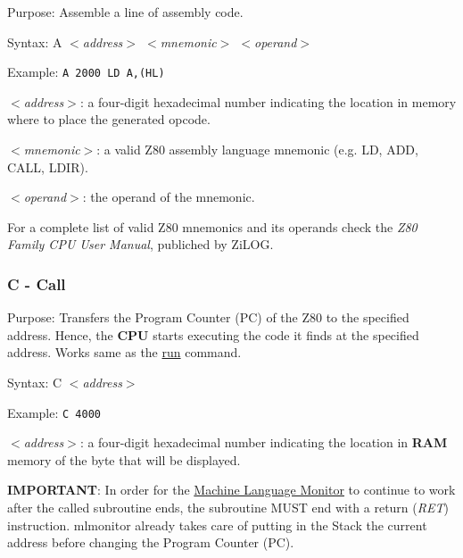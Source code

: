        Purpose: Assemble a line of assembly code.

        Syntax: A \textit{$<$address$>$ $<$mnemonic$>$ $<$operand$>$}

        Example: \texttt{A 2000 LD A,(HL)}

        \hspace{1cm}\textit{$<$address$>$}: a four-digit hexadecimal number indicating
        the location in memory where to place the generated opcode.

        \hspace{1cm}\textit{$<$mnemonic$>$}: a valid Z80 assembly language
        mnemonic (e.g. LD, ADD, CALL, LDIR).

        \hspace{1cm}\textit{$<$operand$>$}: the operand of the mnemonic.

        For a complete list of valid Z80 mnemonics and its operands check the
        \textit{Z80 Family CPU User Manual}\cite{z80manual}, publiched by ZiLOG.

        \subsubsection{C - Call}

        Purpose: Transfers the Program Counter (PC) of the Z80 to the specified
        address. Hence, the \textbf{CPU} starts executing the code it finds at
        the specified address. Works same as the \hyperref[cmd:run]{run} command.

        Syntax: C \textit{$<$address$>$}

        Example: \texttt{C 4000}

        \hspace{1cm}\textit{$<$address$>$}: a four-digit hexadecimal number
        indicating the location in \textbf{RAM} memory of the byte that will be
        displayed.

        \textbf{IMPORTANT}: In order for the \hyperref[software:mlmonitor]
        {Machine Language Monitor} to continue to work after the called
        subroutine ends, the subroutine MUST end with a return (\textit{RET})
        instruction. mlmonitor already takes care of putting in the Stack the
        current address before changing the Program Counter (PC).

